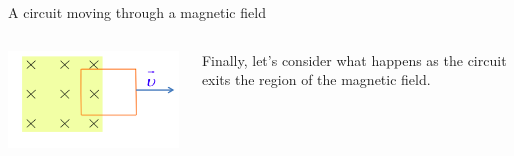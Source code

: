 \begin{frame}{A circuit moving through a magnetic field}

\begin{columns}
  \begin{column}{0.30\textwidth}
    \includegraphics[width=0.99\textwidth]{./images/schematics/circuit_moving_through_magnetic_field_right.png}\\
  \end{column}
  \begin{column}{0.70\textwidth}
    Finally, let's consider what happens as the circuit exits the region of the magnetic field.
  \end{column}
\end{columns}

\vspace{0.3cm}


\end{frame}
